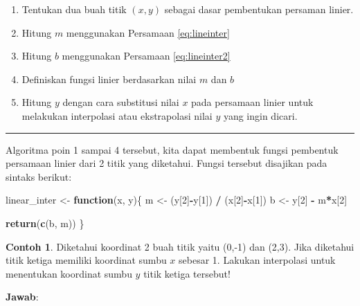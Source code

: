 \documentclass[
]{book}
\newenvironment{Shaded}{\begin{snugshade}}{\end{snugshade}}
\newcommand{\ControlFlowTok}[1]{\textcolor[rgb]{0.13,0.29,0.53}{\textbf{#1}}}
\newcommand{\DecValTok}[1]{\textcolor[rgb]{0.00,0.00,0.81}{#1}}
\newcommand{\FunctionTok}[1]{\textcolor[rgb]{0.13,0.29,0.53}{\textbf{#1}}}
\newcommand{\NormalTok}[1]{#1}
\newcommand{\OtherTok}[1]{\textcolor[rgb]{0.56,0.35,0.01}{#1}}
\newcommand{\SpecialCharTok}[1]{\textcolor[rgb]{0.81,0.36,0.00}{\textbf{#1}}}
\providecommand{\tightlist}{%
  \setlength{\itemsep}{0pt}\setlength{\parskip}{0pt}}
\theoremstyle{definition}
\theoremstyle{definition}
\newtheorem{example}{Contoh}[chapter]
\theoremstyle{definition}
\theoremstyle{definition}
\theoremstyle{remark}
\begin{document}
\begin{enumerate}
\def\labelenumi{\arabic{enumi}.}
\tightlist
\item
  Tentukan dua buah titik \(\left(x,y\right)\) sebagai dasar pembentukan persaman linier.
\item
  Hitung \(m\) menggunakan Persamaan \eqref{eq:lineinter}
\item
  Hitung \(b\) menggunakan Persamaan \eqref{eq:lineinter2}
\item
  Definiskan fungsi linier berdasarkan nilai \(m\) dan \(b\)
\item
  Hitung \(y\) dengan cara substitusi nilai \(x\) pada persamaan linier untuk melakukan interpolasi atau ekstrapolasi nilai \(y\) yang ingin dicari.
\end{enumerate}

\begin{center}\rule{0.5\linewidth}{0.5pt}\end{center}

Algoritma poin 1 sampai 4 tersebut, kita dapat membentuk fungsi pembentuk persamaan linier dari 2 titik yang diketahui. Fungsi tersebut disajikan pada sintaks berikut:

\begin{Shaded}
\begin{Highlighting}[]
\NormalTok{linear\_inter }\OtherTok{\textless{}{-}} \ControlFlowTok{function}\NormalTok{(x, y)\{}
\NormalTok{  m }\OtherTok{\textless{}{-}}\NormalTok{ (y[}\DecValTok{2}\NormalTok{]}\SpecialCharTok{{-}}\NormalTok{y[}\DecValTok{1}\NormalTok{]) }\SpecialCharTok{/}\NormalTok{ (x[}\DecValTok{2}\NormalTok{]}\SpecialCharTok{{-}}\NormalTok{x[}\DecValTok{1}\NormalTok{])}
\NormalTok{  b }\OtherTok{\textless{}{-}}\NormalTok{ y[}\DecValTok{2}\NormalTok{] }\SpecialCharTok{{-}}\NormalTok{ m}\SpecialCharTok{*}\NormalTok{x[}\DecValTok{2}\NormalTok{]}
  
  \FunctionTok{return}\NormalTok{(}\FunctionTok{c}\NormalTok{(b, m))}
\NormalTok{\}}
\end{Highlighting}
\end{Shaded}

\begin{example}
\protect\hypertarget{exm:linterpexmp}{}\label{exm:linterpexmp}Diketahui koordinat 2 buah titik yaitu (0,-1) dan (2,3). Jika diketahui titik ketiga memiliki koordinat sumbu \(x\) sebesar 1. Lakukan interpolasi untuk menentukan koordinat sumbu \(y\) titik ketiga tersebut!
\end{example}

\textbf{Jawab}:
\end{document}
